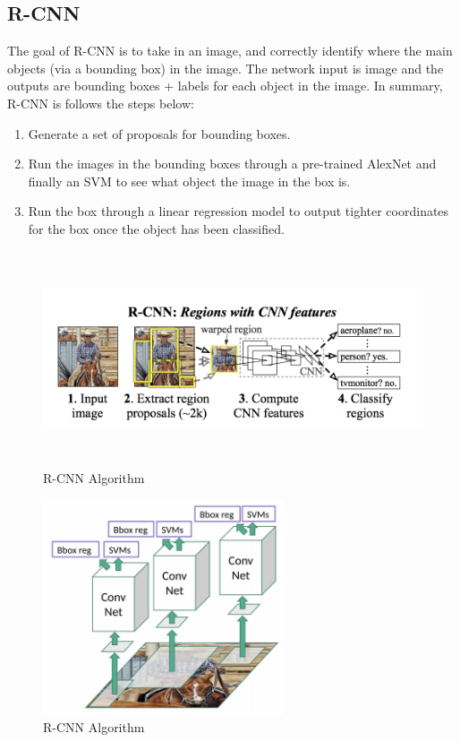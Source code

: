 \documentclass[twoside]{article}
\begin{document}
\subsection{R-CNN\cite{DBLP:journals/corr/GirshickDDM13}}
The goal of R-CNN is to take in an image, and correctly identify where the main objects (via a bounding box) in the image. The network input is image and the outputs are bounding boxes + labels for each object in the image.
In summary, R-CNN is follows the steps below:
\begin{enumerate}
    \item Generate a set of proposals for bounding boxes.
    \item Run the images in the bounding boxes through a pre-trained AlexNet and finally an SVM to see what object the image in the box is.
    \item Run the box through a linear regression model to output tighter coordinates for the box once the object has been classified.
\end{enumerate}
\begin{figure}[!htb]
\centering
\includegraphics[height=2.5in]{pics/rcnn_intro.png}
\caption{R-CNN Algorithm}
\label{fig:rcnn1}
\end{figure}
\begin{figure}[!htb]
\centering
\includegraphics[height=2.5in]{pics/rcnn_intro2.png}
\caption{R-CNN Algorithm}
\label{fig:rcnn2}
\end{figure}
\end{document}
